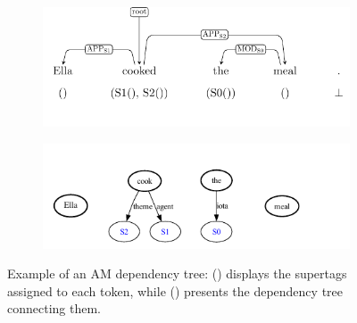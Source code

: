 \begin{figure}[ht]
    \centering
    \begin{subfigure}[t]{0.99\textwidth}
        \centering
        \label{fig:a} 
        \includegraphics[scale=1.2]{figures/AM_dep_tree.pdf}
        \vspace{-1cm}
    \end{subfigure}

    \begin{subfigure}[t]{0.99\textwidth}
        \centering
        \vspace{-2cm}
        \label{fig:b} 
        \includegraphics[scale=1.4]{figures/AM_supertags.pdf}
    \end{subfigure}
    \caption{Example of an AM dependency tree: () displays the supertags assigned to each token, while () presents the dependency tree connecting them.}
    \label{fig:supertag_example}
\end{figure}

